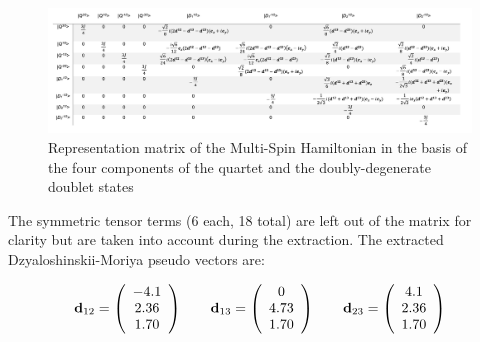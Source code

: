\documentclass[12pt]{report}
\numberwithin{equation}{section}
\begin{document}
\begin{landscape}
\begin{figure}[!ht]
    \centering
    \includegraphics[width=\textwidth]{Images/HMS.png}
    \caption{Representation matrix of the Multi-Spin Hamiltonian in the basis of the four components of the quartet and the doubly-degenerate doublet states}
    \label{fig:HMS3corps}
\end{figure}
\end{landscape}

The symmetric tensor terms (6 each, 18 total) are left out of the matrix for clarity but are taken into account during the extraction.
The extracted Dzyaloshinskii-Moriya pseudo vectors are:

\[     \vb{d}_{12}=
\left( \begin{array}{c}
-4.1  \\
2.36  \\
1.70
\end{array} \right)
    \qquad
    \vb{d}_{13}=
    \left( \begin{array}{c}
    0  \\
    4.73  \\
    1.70
    \end{array} \right)
    \qquad    \vb{d}_{23}=
    \left( \begin{array}{c}
    4.1  \\
    2.36  \\
    1.70
    \end{array} \right)
    \]
\end{document}
